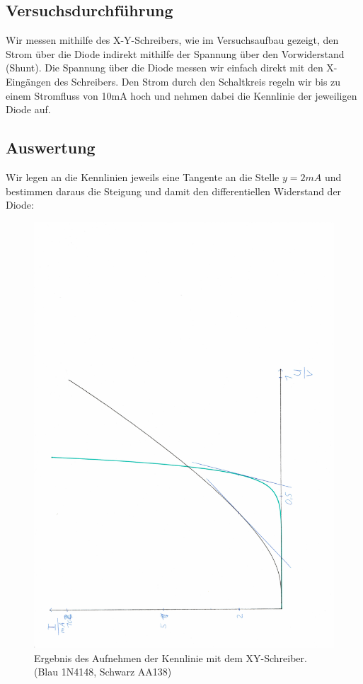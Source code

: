 \documentclass{article}
\begin{document}
\subsection{Versuchsdurchführung}

Wir messen mithilfe des X-Y-Schreibers, wie im Versuchsaufbau gezeigt, den Strom über die Diode indirekt mithilfe der Spannung 
über den Vorwiderstand (Shunt). Die Spannung über die Diode messen wir einfach direkt mit den X-Eingängen des Schreibers. Den Strom durch den Schaltkreis regeln wir bis zu einem Stromfluss von 10mA hoch und nehmen dabei die 
Kennlinie der jeweiligen Diode auf.
\newpage
\subsection{Auswertung}

Wir legen an die Kennlinien jeweils eine Tangente an die Stelle $y=2mA$ und bestimmen daraus die Steigung und damit den differentiellen Widerstand der Diode:
\begin{figure}[h]
  \centering
  \includegraphics[scale=0.4, angle=-90]{../assets/images/EL1P2/ScanXY.PDF}
  \caption{Ergebnis des Aufnehmen der Kennlinie mit dem XY-Schreiber. (Blau 1N4148, Schwarz AA138)}
  \label{fig:xy}
\end{figure}
\end{document}
